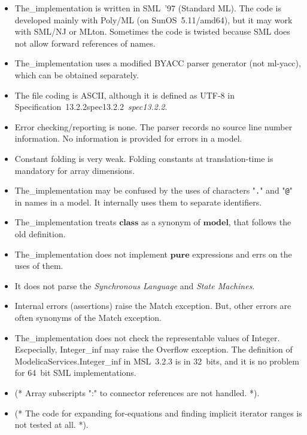 \documentclass[10pt,b5paper]{article}
\def\specrefx#1#2{Specification~#1\ifx\relax#2\relax{}\else~{\it{}#2}\fi}
\def\specref#1{\specrefx{#1}{\csname spec#1\endcsname}}
\begin{document}
\begin{itemize}

\item The_implementation is written in SML~'97 (Standard ML).  The
code is developed mainly with Poly/ML (on SunOS~5.11/amd64), but it
may work with SML/NJ or MLton.  Sometimes the code is twisted because
SML does not allow forward references of names.

\item The_implementation uses a modified BYACC parser generator (not
ml-yacc), which can be obtained separately.

\item The file coding is ASCII, although it is defined as UTF-8 in
\specref{13.2.2}.

\item Error checking/reporting is none.  The parser records no source
line number information.  No information is provided for errors in a
model.

\item Constant folding is very weak.  Folding constants at
translation-time is mandatory for array dimensions.

\item The_implementation may be confused by the uses of characters
"{\tt{}.}" and "{\tt{}@}" in names in a model.  It internally uses
them to separate identifiers.

\item The_implementation treats $\mathbf{class}$ as a synonym of
$\mathbf{model}$, that follows the old definition.

\item The_implementation does not implement $\mathbf{pure}$
expressions and errs on the uses of them.

\item It does not parse the {\it{}Synchronous Language\/} and
{\it{}State Machines}.

\item Internal errors (assertions) raise the Match exception.  But,
other errors are often synonyms of the Match exception.

\item The_implementation does not check the representable values of
{Integer}.  Escpecially, {Integer\_inf} may raise the Overflow
exception.  The definition of {ModelicaServices.Integer\_inf} in
MSL~3.2.3 is in 32~bits, and it is no problem for 64~bit SML
implementations.

\item (* Array subscripts ":" to connector references are not
handled. *).

\item (* The code for expanding for-equations and finding implicit
iterator ranges is not tested at all. *).

\end{itemize}
\end{document}
